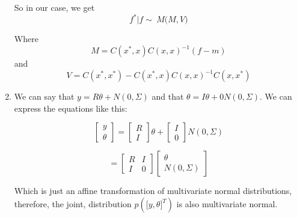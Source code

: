 \documentclass[10pt]{article}
\begin{document}
\begin{enumerate}[label=(\Alph*)]
        So in our case, we get 
        $$f^*|f \sim\ M\bigg(M, V\bigg)$$
        
        Where 
        $$M = C(x^*, x)C(x,x)^{-1}(f-m)$$
        and 
        $$V = C(x^*,x^*) -  C(x^*,x)C(x,x)^{-1}C(x,x^*)$$
        
        
        \item
        We can say that $y = R\theta + N(0,\Sigma)$ and that $\theta = I\theta + 0 N(0,\Sigma)$. We can express the equations like this:


        $$\begin{bmatrix}y \\ \theta \end{bmatrix}
        = \begin{bmatrix} R \\ I \end{bmatrix} \theta
        +\begin{bmatrix} I \\ 0 \end{bmatrix} N(0,\Sigma)$$

        $$=\begin{bmatrix} R & I \\ I & 0 \end{bmatrix}
        \begin{bmatrix} \theta \\ N(0,\Sigma) \end{bmatrix}$$

        Which is just an affine transformation of multivariate normal distributions, therefore, the joint, distribution $p(\big[y,\theta\big]^T)$ is also multivariate normal. 
        \end{enumerate}
\end{document}
